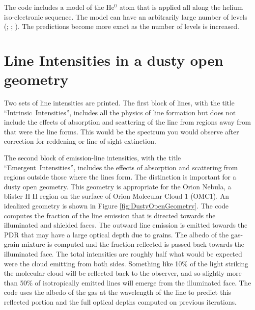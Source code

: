 The code includes a model of the He$^0$ atom that is applied all along the
helium iso-electronic sequence.
The model can have an arbitrarily large
number of levels (\citealp{Bauman2005}; \citealp{Porter2005}; \citealp{PorterFerland2007}).
The predictions become more exact as the number of levels is
increased.

\section{Line Intensities in a dusty open geometry}

Two sets of line intensities are printed.
The first block of lines,
with the title ``Intrinsic~Intensities'',
includes all the physics of line
formation but does not include the effects of absorption and scattering
of the line from regions away from that were the line forms. This would
be the spectrum you would observe after correction for reddening or line
of sight extinction.

The second block of emission-line intensities, with the title
``Emergent~Intensities'',
includes the effects of absorption and scattering from regions
outside those where the lines form.
The distinction is important for a
dusty open geometry.
This geometry is appropriate for the Orion Nebula,
a blister H II region on the surface of Orion Molecular Cloud 1 (OMC1).
An idealized geometry is shown in Figure \ref{fig:DustyOpenGeometry}.
The code computes the fraction
of the line emission that is directed towards the illuminated and shielded
faces.  The outward line emission is emitted towards the PDR that may have
a large optical depth due to grains.  The albedo of the gas-grain mixture
is computed and the fraction reflected is passed back towards the illuminated
face.  The total intensities are roughly half what would be expected were
the cloud emitting from both sides.  Something like 10\% of the light
striking the molecular cloud will be reflected back to the observer, and
so slightly more than 50\% of isotropically emitted lines will emerge from
the illuminated face.  The code uses the albedo of the gas at the wavelength
of the line to predict this reflected portion and the full optical depths
computed on previous iterations.

